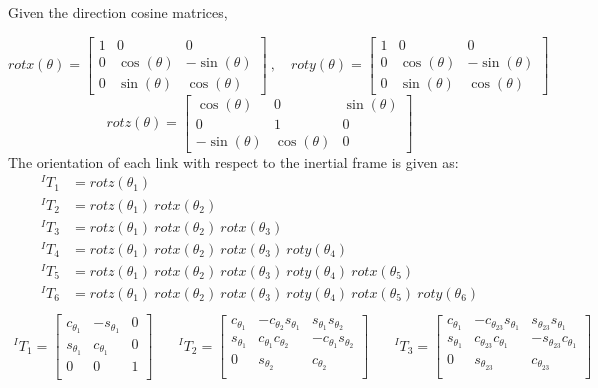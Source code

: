 \documentclass[12pt]{report}
\begin{document}
\newpage
Given the direction cosine matrices,

\[
rotx(\theta) = \begin{bmatrix}
 1 & 0 & 0\\
 0 & \cos(\theta) & -\sin(\theta) \\
 0 & \sin(\theta) & \cos(\theta)
\end{bmatrix}~,\quad
roty(\theta) = \begin{bmatrix}
 1 & 0 & 0\\
 0 & \cos(\theta) & -\sin(\theta) \\
 0 & \sin(\theta) & \cos(\theta)
\end{bmatrix}
\]
\[
rotz(\theta) = \begin{bmatrix}
 \cos(\theta) & 0 & \sin(\theta)\\
  0 & 1 & 0 \\
 -\sin(\theta) & \cos(\theta) & 0
\end{bmatrix}
\]
The orientation of each link with respect to the inertial frame is given as:
\[
\begin{aligned}
^IT_1 &= rotz(\theta_1) \\
^IT_2 &= rotz(\theta_1)~rotx(\theta_2)\\
^IT_3 &= rotz(\theta_1)~rotx(\theta_2)~rotx(\theta_3)\\
^IT_4 &= rotz(\theta_1)~rotx(\theta_2)~rotx(\theta_3)~roty(\theta_4)\\
^IT_5 &= rotz(\theta_1)~rotx(\theta_2)~rotx(\theta_3)~roty(\theta_4)~rotx(\theta_5)\\
^IT_6 &= rotz(\theta_1)~rotx(\theta_2)~rotx(\theta_3)~roty(\theta_4)~rotx(\theta_5)~roty(\theta_6)\\
\end{aligned}
\]
\[
\begin{aligned}
  ^IT_1 =
  \begin{bmatrix}
    c_{\theta_1}& -s_{\theta_1}& 0\\
    s_{\theta_1}&  c_{\theta_1}& 0\\
    0&            0& 1\\
  \end{bmatrix} & \quad
  ^IT_2 =
  \begin{bmatrix}
    c_{\theta_1}& -c_{\theta_2}s_{\theta_1}&  s_{\theta_1}s_{\theta_2}\\
    s_{\theta_1}&  c_{\theta_1}c_{\theta_2}& -c_{\theta_1}s_{\theta_2}\\
    0&              s_{\theta_2}&              c_{\theta_2}\\
  \end{bmatrix} & \quad
  ^IT_3 =
  \begin{bmatrix}
    c_{\theta_1}& -c_{\theta_{23}}s_{\theta_1}&  s_{\theta_{23}}s_{\theta_1}\\
    s_{\theta_1}&  c_{\theta_{23}}c_{\theta_1}& -s_{\theta_{23}}c_{\theta_1}\\
    0&              s_{\theta_{23}}&              c_{\theta_{23}}\\
  \end{bmatrix}
\end{aligned}
\]
\end{document}
